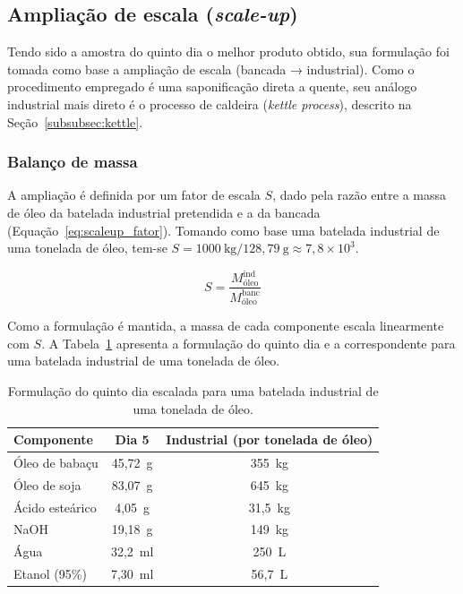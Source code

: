 \subsection{Ampliação de escala (\textit{scale-up})}

Tendo sido a amostra do quinto dia o melhor produto obtido, sua formulação foi tomada como base a ampliação de escala (bancada → industrial). Como o procedimento empregado é uma saponificação direta a quente, seu análogo industrial mais direto é o processo de caldeira (\textit{kettle process}), descrito na Seção~\ref{subsubsec:kettle}.

\subsubsection{Balanço de massa}

A ampliação é definida por um fator de escala $S$, dado pela razão entre a massa de óleo da batelada industrial pretendida e a da bancada (Equação~\ref{eq:scaleup_fator}). Tomando como base uma batelada industrial de uma tonelada de óleo, tem-se $S = 1000~\text{kg} / 128{,}79~\text{g} \approx 7{,}8 \times 10^{3}$.

\begin{equation}
    S = \frac{M_{\text{óleo}}^{\text{ind}}}{M_{\text{óleo}}^{\text{banc}}}
    \label{eq:scaleup_fator}
\end{equation}

Como a formulação é mantida, a massa de cada componente escala linearmente com $S$. A Tabela~\ref{tab:scaleup} apresenta a formulação do quinto dia e a correspondente para uma batelada industrial de uma tonelada de óleo.

\begin{table}[H]
    \centering
    \footnotesize
    \caption{Formulação do quinto dia escalada para uma batelada industrial de uma tonelada de óleo.}
    \label{tab:scaleup}
    \begin{tabular}{lcc}
        \toprule
        \textbf{Componente} & \textbf{Dia 5} & \textbf{Industrial (por tonelada de óleo)} \\
        \midrule
        Óleo de babaçu     & 45,72~g   & 355~kg \\
        Óleo de soja       & 83,07~g   & 645~kg \\
        Ácido esteárico    & 4,05~g    & 31,5~kg \\
        NaOH               & 19,18~g   & 149~kg \\
        Água               & 32,2~ml   & 250~L \\
        Etanol (95\%)      & 7,30~ml   & 56,7~L \\
        \bottomrule
    \end{tabular}
\end{table}

